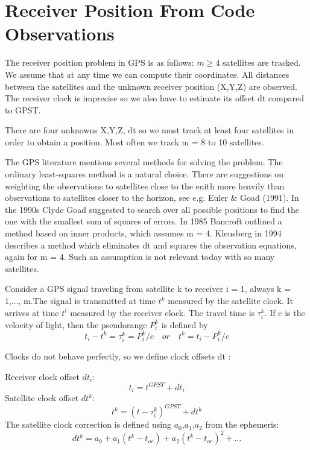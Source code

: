 \section{Receiver Position From Code Observations}
	The receiver position problem in GPS is as follows: $m\geq4$ satellites are tracked. We assume that at any time we can compute their coordinates. All distances between the satellites and the unknown receiver position (X,Y,Z) are observed. The receiver clock is imprecise so we also have to estimate its offset dt compared to GPST.
	
	There are four unknowns X,Y,Z, dt so we must track at least four satellites in order to obtain a position. Most often we track m = 8 to 10 satellites.
	
	The GPS literature mentions several methods for solving the problem. The ordinary least-squares method is a natural choice. There are suggestions on weighting the observations to satellites close to the enith more heavily than observations to satellites closer to the horizon, see e.g. Euler $\&$ Goad (1991). In the 1990s Clyde Goad suggested to search over all possible positions to find the one with the smallest sum of squares of errors. In 1985 Bancroft outlined a method based on inner products, which assumes m = 4. Kleusberg in 1994 describes a method which eliminates dt and squares the observation equations, again for m = 4. Such an assumption is not relevant today with so many satellites.
	
	Consider a GPS signal traveling from satellite k to receiver i = 1, always k = 1,..., m.The signal is transmitted at time $t^k$ measured by the satellite clock. It arrives at time $t^i$ measured by the receiver clock. The travel time is $\tau^k_i$. If c is the velocity of light, then the pseudorange $P^k_i$ is defined by
	\begin{equation}\label{eq:9.13}
		t_i-t^k=\tau^k_i=P^k_i/c \quad or\quad  t^k=t_i-P^k_i/c 
	\end{equation}
	
	Clocks do not behave perfectly, so we define clock offsets dt :
	
	Receiver clock offset $dt_i$:
	\begin{equation}\label{9.14}
		t_i = t^{GPST}+dt_i
	\end{equation} 
	Satellite clock offset $dt^k$:
	\begin{equation}\label{eq:9.15}
		t^k = (t-\tau ^k_i)^{GPST}+dt^k
	\end{equation}
	The satellite clock correction is defined using $a_0$,$a_1$,$a_2$ from the ephemeris:
	\begin{equation}\label{eq:9.16}
		dt^k=a_0+a_1(t^k-t_{oe})+a_2(t^k-t_{oe})^2+\ldots
	\end{equation}
	
